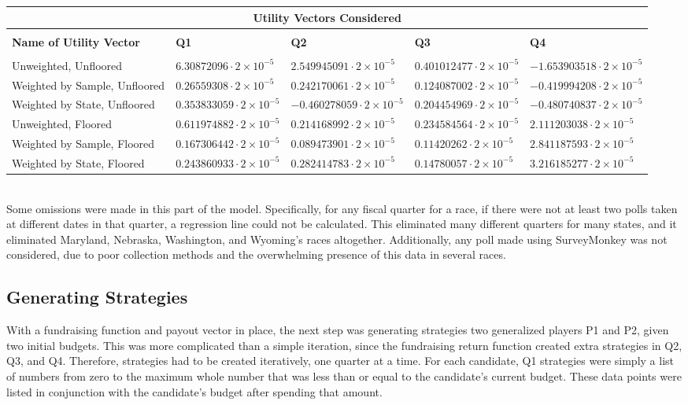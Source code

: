 \documentclass[11pt]{article}
\begin{document}
\begin{tabular}{|p{4.5cm}|p{2.2cm}|p{2.2cm}|p{2.2cm}|p{2.2cm}|}
\hline
\multicolumn{5}{|c|}{Utility Vectors Considered} \\
\hline
& & & &\\
\textbf{Name of Utility Vector} & \textbf{Q1} & \textbf{Q2} & \textbf{Q3} & \textbf{Q4}\\
& & & &\\
\hline
\tiny{Unweighted, Unfloored} & $6.30872096 \cdot 2\times 10^{-5}$ & $2.549945091 \cdot 2\times 10^{-5}$ & $0.401012477 \cdot 2\times 10^{-5}$ & $-1.653903518 \cdot 2\times 10^{-5}$\\
\hline
\tiny{Weighted by Sample, Unfloored} & $0.26559308 \cdot 2\times 10^{-5}$ & $0.242170061\cdot 2\times 10^{-5}$ & $0.124087002\cdot 2\times 10^{-5}$ & $-0.419994208\cdot 2\times 10^{-5}$\\
\hline
\tiny{Weighted by State, Unfloored} & $0.353833059\cdot 2\times 10^{-5}$ & $-0.460278059\cdot 2\times 10^{-5}$ & $0.204454969\cdot 2\times 10^{-5}$ & $-0.480740837\cdot 2\times 10^{-5}$\\
\hline
\tiny{Unweighted, Floored} & $0.611974882\cdot 2\times 10^{-5}$ & $0.214168992\cdot 2\times 10^{-5}$ & $0.234584564\cdot 2\times 10^{-5}$ & $2.111203038\cdot 2\times 10^{-5}$\\
\hline
\tiny{Weighted by Sample, Floored} & $0.167306442\cdot 2\times 10^{-5}$ & $0.089473901\cdot 2\times 10^{-5}$ & $0.11420262\cdot 2\times 10^{-5}$ & $2.841187593\cdot 2\times 10^{-5}$\\
\hline
\tiny{Weighted by State, Floored} & $0.243860933\cdot 2\times 10^{-5}$ & $0.282414783\cdot 2\times 10^{-5}$ & $0.14780057\cdot 2\times 10^{-5}$ & $3.216185277\cdot 2\times 10^{-5}$\\
\hline
\end{tabular}
 \\
Some omissions were made in this part of the model. Specifically, for any
fiscal quarter for a race, if there were not at least two polls taken at
different dates in that quarter, a regression line could not be
calculated. This eliminated many different quarters for many states, and it
eliminated Maryland, Nebraska, Washington, and Wyoming's races
altogether. Additionally, any poll made using SurveyMonkey was not considered,
due to poor collection methods and the overwhelming presence of this data in
several races.

\subsection{Generating Strategies}
With a fundraising function and payout vector in place, the next step was
generating strategies two generalized players P1 and P2, given two initial
budgets. This was more complicated than a simple iteration, since the
fundraising return function created extra strategies in Q2, Q3, and
Q4. Therefore, strategies had to be created iteratively, one quarter at a
time. For each candidate, Q1 strategies were simply a list of numbers from zero
to the maximum whole number that was less than or equal to the candidate's
current budget. These data points were listed in conjunction with the
candidate's budget after spending that amount.
\end{document}
